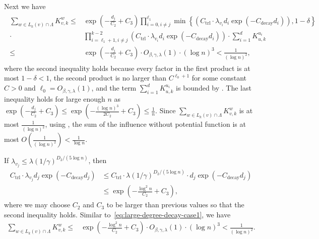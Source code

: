 \documentclass[11pt]{amsart}
\newcommand{\tp}[1]{{\left( #1 \right)}}
\theoremstyle{definition}
\theoremstyle{remark}
\begin{document}
Next we have
\begin{align}\label{eq:large-degree-decay-case1}
\begin{split}
    \sum_{w\in L_k(v) \cap \Lambda}K_{v,k}^{w}\leq &\exp\left(-\frac{d_j}{C_2}+C_3\right)\prod_{i=0,i\neq j}^{\ell_1}\min\left \{\tp{C_{\text{trl}} \cdot \lambda_{v_i} d_i \exp(-C_{\text{decay}}d_i)},1-\delta\right \}\\
    \cdot&\prod_{i=\ell_1+1,i\neq j}^{k-2}\tp{C_{\text{trl}} \cdot \lambda_{v_i} d_i \exp(-C_{\text{decay}}d_i)} \cdot \sum_{i=1}^d K_{u,k}^{u_i}\\
    \leq &\exp\left(-\frac{d_j}{C_2}+C_3\right) \cdot O_{\beta,\gamma,\lambda}(1) \cdot (\log n)^3 < \frac{1}{(\log n)^2},
\end{split}
\end{align} 
where the second inequality holds because every factor in the first product is at most $ 1 - \delta < 1$, the second product is no larger than $C^{\ell_0+1}$ for some constant $C>0$ and $\ell_0=O_{\beta,\gamma,\lambda}(1)$, and the term $\sum_{i=1}^d K_{u,k}^{u_i}$ is bounded by .
The last inequality holds for large enough $n$ as $\exp\left(-\frac{d_j}{C_2}+C_3\right)\leq \exp\left(-\frac{(\log n)^3}{2C_2}+C_3\right)\leq \frac{1}{n}$. Since $\sum_{w\in L_k(v) \cap \Lambda}K_{v,k}^{w}$ is at most $\frac{1}{(\log n)^2}$, using , the sum of the influence without potential function is at most $O(\frac{1}{(\log n)^2}) < \frac{1}{\log n}$.

If $\lambda_{v_j} \leq \lambda (1/\gamma)^{D_2/(5 \log n)}$, then
\begin{align*}
    C_{\text{trl}} \cdot \lambda_{v_j} d_j \exp(-C_{\text{decay}}d_j)&\leq C_{\text{trl}} \cdot \lambda (1/\gamma)^{D_2/(5 \log n)} \cdot d_j \exp(-C_{\text{decay}}d_j)\\
    &\leq \exp\left(-\frac{\log^2 n}{C_2}+C_3\right), 
\end{align*}
where we may choose $C_2$ and $C_3$ to be larger than previous values so that the second inequality holds. Similar to~\eqref{eq:large-degree-decay-case1}, we have
\begin{align*}
    \sum_{w\in L_k(v) \cap \Lambda}K_{v,k}^{w}\leq &\exp\left(-\frac{\log^2 n}{C_2}+C_3\right) \cdot O_{\beta,\gamma,\lambda}(1) \cdot (\log n)^3 < \frac{1}{(\log n)^2}.
\end{align*}
\end{document}
